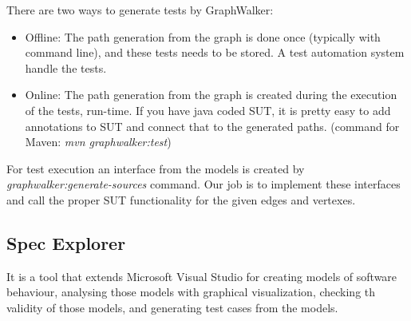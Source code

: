 There are two ways to generate tests by GraphWalker:
\begin{itemize}
	\item Offline: The path generation from the graph is done once (typically with command line), and these tests needs to be stored. A test automation system handle the tests. 
	\item Online: The path generation from the graph is created during the execution of the tests, run-time. If you have java coded SUT, it is pretty easy to add annotations to SUT and connect that to the generated paths. (command for Maven: \textit{mvn graphwalker:test})
\end{itemize}

For test execution an interface from the models is created by \textit{graphwalker:generate-sources} command. Our job is to implement these interfaces and call the proper SUT functionality for the given edges and vertexes.

\subsection{Spec Explorer} \label{mbt:tools:specExplorer}

It is a tool that extends  Microsoft Visual Studio for creating models of software behaviour, analysing those models with graphical visualization, checking th validity of those models, and generating test cases from the models.

